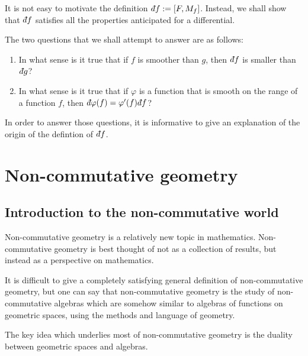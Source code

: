 It is not easy to motivate the definition $\qd f := [F,M_f]$. Instead,
we shall show that $\qd f$ satisfies all the properties
anticipated for a differential. 

The two questions that we shall attempt to answer are as follows:
\begin{enumerate}
    \item{} In what sense is it true that if $f$ is smoother than $g$, then $\qd f$
    is smaller than $\qd g$?
    \item{} In what sense is it true that if $\varphi$ is a function that is smooth
    on the range of a function $f$, then $\qd \varphi(f) = \varphi'(f)\qd f$?
\end{enumerate}

In order to answer those questions, it is informative to give an explanation
of the origin of the defintion of $\qd f$. 

\section{Non-commutative geometry}

\subsection{Introduction to the non-commutative world}
Non-commutative geometry is a relatively new topic in mathematics. Non-commutative
geometry is best thought of not as a collection of results, but instead as a
perspective on mathematics. 

It is difficult to give a completely satisfying general definition of non-commutative geometry, but 
one can say that non-commutative geometry is the study of non-commutative algebras
which are somehow similar to algebras of functions on geometric spaces, using
the methods and language of geometry.

The key idea which underlies most of non-commutative geometry is the duality
between geometric spaces and algebras. 

